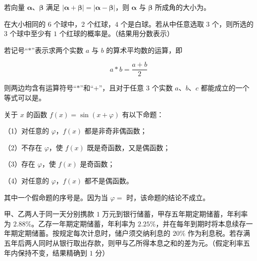 \begin{question}
若向量 $\boldsymbol{\alpha}$、$\boldsymbol{\beta}$ 满足 $\lvert\boldsymbol{\alpha}+\boldsymbol{\beta}\rvert=\lvert\boldsymbol{\alpha}-\boldsymbol{\beta}\rvert$，则 $\boldsymbol{\alpha}$ 与 $\boldsymbol{\beta}$ 所成角的大小为\gkblank{}。

\end{question}
\begin{question}
在大小相同的 $6$ 个球中，$2$ 个红球，$4$ 个是白球。若从中任意选取 $3$ 个，则所选的 $3$ 个球中至少有 $1$ 个红球的概率是\gkblank{}。（结果用分数表示）

\end{question}
\begin{question}
若记号“$\ast$”表示求两个实数 $a$ 与 $b$ 的算术平均数的运算，即

\nopagebreak[4]
\[
a\ast b=\dfrac{a+b}{2}
\]

则两边均含有运算符号“$\ast$”和“$+$”，且对于任意 $3$ 个实数 $a\text{、}b\text{、}c$ 都能成立的一个等式可以是\gkblank{}。

\end{question}
\begin{question}
关于 $x$ 的函数 $f(x)=\sin(x+\varphi)$ 有以下命题：

（1）对任意的 $\varphi$，$f(x)$ 都是非奇非偶函数；

（2）不存在 $\varphi$，使 $f(x)$ 既是奇函数，又是偶函数；

（3）存在 $\varphi$，使 $f(x)$ 是奇函数；

（4）对任意的 $\varphi$，$f(x)$ 都不是偶函数。

其中一个假命题的序号是\gkblank{}。因为当 $\varphi=$\gkblank{} 时，该命题的结论不成立。

\end{question}
\begin{question}
甲、乙两人于同一天分别携款 $1$ 万元到银行储蓄，甲存五年期定期储蓄，年利率为 $2.88\%$。乙存一年期定期储蓄，年利率为 $2.25\%$，并在每年到期时将本息续存一年期定期储蓄。按规定每次计息时，储户须交纳利息的 $20\%$ 作为利息税。若存满五年后两人同时从银行取出存款，则甲与乙所得本息之和的差为\gkblank{}元。（假定利率五年内保持不变，结果精确到 $1$ 分）

\end{question}

